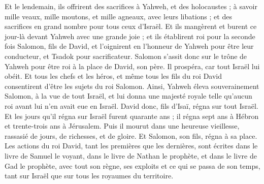 \begin{multicols}{2}
Et le lendemain, ils offrirent des sacrifices à Yahweh, et des holocaustes ; à savoir mille veaux, mille moutons, et mille agneaux, avec leurs libations ; et des sacrifices en grand nombre pour tous ceux d'Israël.
Et ils mangèrent et burent ce jour-là devant Yahweh avec une grande joie ; et ils établirent roi pour la seconde fois Salomon, fils de David, et l'oignirent en l'honneur de Yahweh pour être leur conducteur, et Tsadok pour sacrificateur.
Salomon s'assit donc sur le trône de Yahweh pour être roi à la place de David, son père. Il prospéra, car tout Israël lui obéit.
Et tous les chefs et les héros, et même tous les fils du roi David consentirent d'être les sujets du roi Salomon.
Ainsi, Yahweh éleva souverainement Salomon, à la vue de tout Israël, et lui donna une majesté royale telle qu'aucun roi avant lui n'en avait eue en Israël.
David donc, fils d'Isaï, régna sur tout Israël.
Et les jours qu'il régna sur Israël furent quarante ans ; il régna sept ans à Hébron et trente-trois ans à Jérusalem.
Puis il mourut dans une heureuse vieillesse, rassasié de jours, de richesses, et de gloire. Et Salomon, son fils, régna à sa place.
Les actions du roi David, tant les premières que les dernières, sont écrites dans le livre de Samuel le voyant, dans le livre de Nathan le prophète, et dans le livre de Gad le prophète,
avec tout son règne, ses exploits et ce qui se passa de son temps, tant sur Israël que sur tous les royaumes du territoire.
\PPE{}
\end{multicols}

